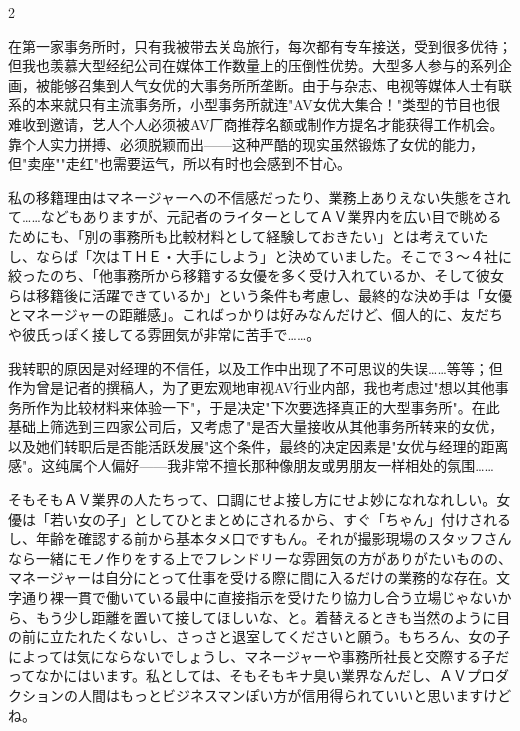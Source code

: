 \documentclass[12pt,UTF8]{ctexbook}
\begin{document}
\begin{paracol}{2}
\switchcolumn

在第一家事务所时，只有我被带去关岛旅行，每次都有专车接送，受到很多优待；但我也羡慕大型经纪公司在媒体工作数量上的压倒性优势。大型多人参与的系列企画，被能够召集到人气女优的大事务所所垄断。由于与杂志、电视等媒体人士有联系的本来就只有主流事务所，小型事务所就连"AV女优大集合！"类型的节目也很难收到邀请，艺人个人必须被AV厂商推荐名额或制作方提名才能获得工作机会。靠个人实力拼搏、必须脱颖而出——这种严酷的现实虽然锻炼了女优的能力，但"卖座""走红"也需要运气，所以有时也会感到不甘心。

\switchcolumn*

私の移籍理由はマネージャーへの不信感だったり、業務上ありえない失態をされて……などもありますが、元記者のライターとしてＡＶ業界内を広い目で眺めるためにも、「別の事務所も比較材料として経験しておきたい」とは考えていたし、ならば「次はＴＨＥ・大手にしよう」と決めていました。そこで３〜４社に絞ったのち、「他事務所から移籍する女優を多く受け入れているか、そして彼女らは移籍後に活躍できているか」という条件も考慮し、最終的な決め手は「女優とマネージャーの距離感」。こればっかりは好みなんだけど、個人的に、友だちや彼氏っぽく接してる雰囲気が非常に苦手で……。

\switchcolumn

我转职的原因是对经理的不信任，以及工作中出现了不可思议的失误……等等；但作为曾是记者的撰稿人，为了更宏观地审视AV行业内部，我也考虑过"想以其他事务所作为比较材料来体验一下"，于是决定"下次要选择真正的大型事务所"。在此基础上筛选到三四家公司后，又考虑了"是否大量接收从其他事务所转来的女优，以及她们转职后是否能活跃发展"这个条件，最终的决定因素是"女优与经理的距离感"。这纯属个人偏好——我非常不擅长那种像朋友或男朋友一样相处的氛围……

\switchcolumn*

そもそもＡＶ業界の人たちって、口調にせよ接し方にせよ妙になれなれしい。女優は「若い女の子」としてひとまとめにされるから、すぐ「ちゃん」付けされるし、年齢を確認する前から基本タメ口ですもん。それが撮影現場のスタッフさんなら一緒にモノ作りをする上でフレンドリーな雰囲気の方がありがたいものの、マネージャーは自分にとって仕事を受ける際に間に入るだけの業務的な存在。文字通り裸一貫で働いている最中に直接指示を受けたり協力し合う立場じゃないから、もう少し距離を置いて接してほしいな、と。着替えるときも当然のように目の前に立たれたくないし、さっさと退室してくださいと願う。もちろん、女の子によっては気にならないでしょうし、マネージャーや事務所社長と交際する子だってなかにはいます。私としては、そもそもキナ臭い業界なんだし、ＡＶプロダクションの人間はもっとビジネスマンぽい方が信用得られていいと思いますけどね。


\end{paracol}
\end{document}
